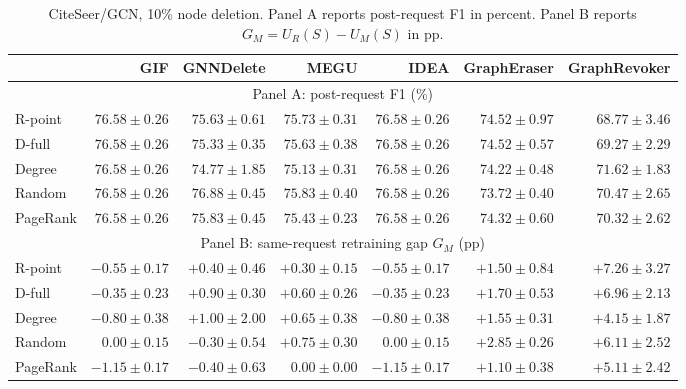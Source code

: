 \begin{table}[t]
\centering
\scriptsize
\setlength{\tabcolsep}{4pt}
\caption{CiteSeer/GCN, 10\% node deletion. Panel A reports post-request F1 in percent. Panel B reports $G_M=U_R(S)-U_M(S)$ in pp.}
\label{tab:citeseer-full}
\begin{tabular}{lrrrrrr}
\toprule
 & GIF & GNNDelete & MEGU & IDEA & GraphEraser & GraphRevoker \\
\midrule
\multicolumn{7}{c}{Panel A: post-request F1 (\%)} \\
\midrule
R-point & $76.58\pm0.26$ & $75.63\pm0.61$ & $75.73\pm0.31$ & $76.58\pm0.26$ & $74.52\pm0.97$ & $68.77\pm3.46$ \\
D-full & $76.58\pm0.26$ & $75.33\pm0.35$ & $75.63\pm0.38$ & $76.58\pm0.26$ & $74.52\pm0.57$ & $69.27\pm2.29$ \\
Degree & $76.58\pm0.26$ & $74.77\pm1.85$ & $75.13\pm0.31$ & $76.58\pm0.26$ & $74.22\pm0.48$ & $71.62\pm1.83$ \\
Random & $76.58\pm0.26$ & $76.88\pm0.45$ & $75.83\pm0.40$ & $76.58\pm0.26$ & $73.72\pm0.40$ & $70.47\pm2.65$ \\
PageRank & $76.58\pm0.26$ & $75.83\pm0.45$ & $75.43\pm0.23$ & $76.58\pm0.26$ & $74.32\pm0.60$ & $70.32\pm2.62$ \\
\midrule
\multicolumn{7}{c}{Panel B: same-request retraining gap $G_M$ (pp)} \\
\midrule
R-point & $-0.55\pm0.17$ & $+0.40\pm0.46$ & $+0.30\pm0.15$ & $-0.55\pm0.17$ & $+1.50\pm0.84$ & $+7.26\pm3.27$ \\
D-full & $-0.35\pm0.23$ & $+0.90\pm0.30$ & $+0.60\pm0.26$ & $-0.35\pm0.23$ & $+1.70\pm0.53$ & $+6.96\pm2.13$ \\
Degree & $-0.80\pm0.38$ & $+1.00\pm2.00$ & $+0.65\pm0.38$ & $-0.80\pm0.38$ & $+1.55\pm0.31$ & $+4.15\pm1.87$ \\
Random & $0.00\pm0.15$ & $-0.30\pm0.54$ & $+0.75\pm0.30$ & $0.00\pm0.15$ & $+2.85\pm0.26$ & $+6.11\pm2.52$ \\
PageRank & $-1.15\pm0.17$ & $-0.40\pm0.63$ & $0.00\pm0.00$ & $-1.15\pm0.17$ & $+1.10\pm0.38$ & $+5.11\pm2.42$ \\
\bottomrule
\end{tabular}
\end{table}

